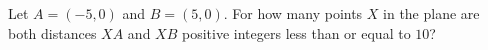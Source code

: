 Let $A=(-5,0)$ and $B=(5,0)$. For how many points $X$ in the plane are both distances $XA$ and $XB$ positive integers less than or equal to $10$?

